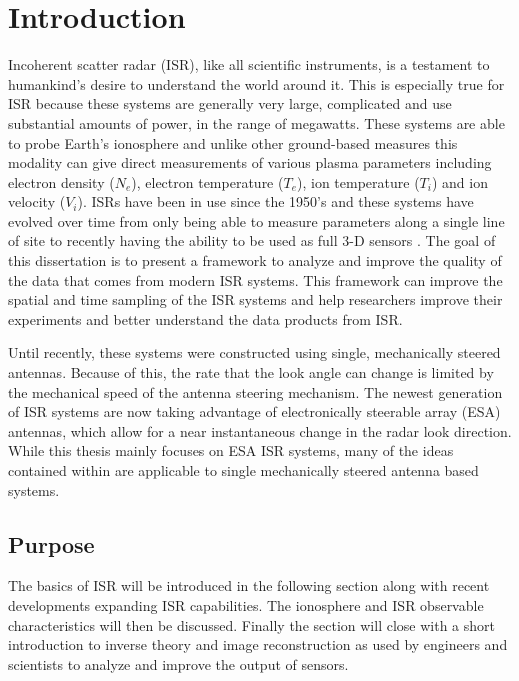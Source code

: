 \chapter{Introduction}
\label{chapter:body}
\thispagestyle{myheadings}
\setcounter{tocdepth}{1}
\graphicspath{{1_Intro/Figures/}}

Incoherent scatter radar (ISR), like all scientific instruments, is a testament to humankind's desire to understand the world around it. This is especially true for ISR because these systems are generally very large, complicated and use substantial amounts of power, in the range of megawatts. These systems are able to probe Earth's ionosphere and unlike other ground-based measures this modality can give direct measurements of various plasma parameters including electron density ($N_e$), electron temperature ($T_e$), ion temperature ($T_i$) and ion velocity ($V_i$). ISRs have been in use since the 1950's \cite{gordon58} and these systems have evolved over time from only being able to measure parameters along a single line of site to recently having the ability to be used as full 3-D sensors \cite{Semeter2009738,Nicolls:2007ie}. The goal of this dissertation is to present a framework to analyze and improve the quality of the data that comes from modern ISR systems. This framework can  improve the spatial and time sampling of the ISR systems and help researchers improve their experiments and better understand the data products from ISR.

Until recently, these systems were constructed using single, mechanically steered antennas. Because of this, the rate that the look angle can change is limited by the mechanical speed of the antenna steering mechanism. The newest generation of ISR systems are now taking advantage of electronically steerable array (ESA) antennas, which allow for a near instantaneous change in the radar look direction. While this thesis mainly focuses on ESA ISR systems, many of the ideas contained within are applicable to single mechanically steered antenna based systems. 
 
\section{Purpose}
The basics of ISR will be introduced in the following section along with recent developments expanding ISR capabilities. The ionosphere and ISR observable characteristics will then be discussed. Finally the section will close with a short introduction to inverse theory and image reconstruction as used by engineers and scientists to analyze and improve the output of sensors.


